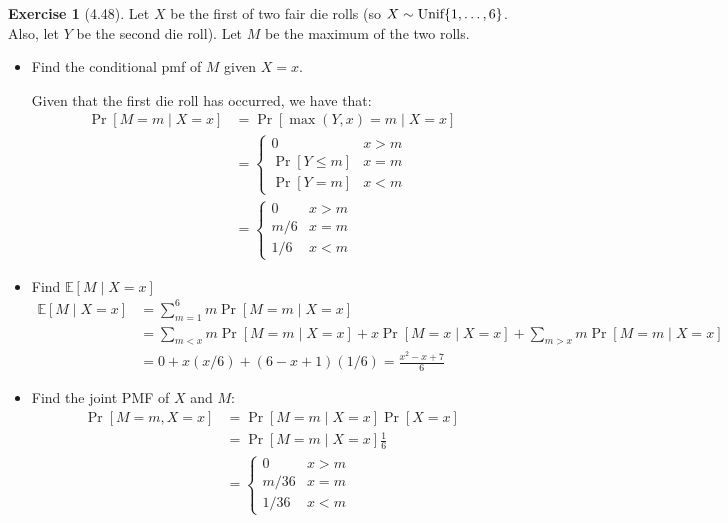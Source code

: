 \documentclass{article}
\theoremstyle{definition}
\newtheorem{exercise}{Exercise}[section]
\newcommand{\E}{\mathbb{E}}
\begin{document}
\begin{exercise}[4.48]
Let $X$ be the first of two fair die rolls (so $X\sim\text{Unif}\Bqty{1,\dots,6}$. Also, let $Y$ be the second die roll).
Let $M$ be the maximum of the two rolls.
\begin{itemize}
\item Find the conditional pmf of $M$ given $X = x$.

Given that the first die roll has occurred, we have that: 
\begin{align*}
\Pr[M = m\mid X = x] &= \Pr[\max(Y,x) = m\mid X = x] \\
&= \begin{cases}
0 & x > m \\
\Pr[Y \leq m] & x = m \\
\Pr[Y = m] & x < m
\end{cases}\\
&=\begin{cases}
0 & x > m \\
m/6 & x = m \\
1/6 & x < m
\end{cases}
\end{align*}
\item Find $\E[M\mid X = x]$
\begin{align*}
\E[M\mid X = x] &= \sum_{m = 1}^6 m\Pr[M = m\mid X = x] \\
& = \sum_{m < x} m \Pr[M= m\mid X =x ] + x\Pr[M = x\mid X = x] + \sum_{m > x}m \Pr[M = m\mid X = x] \\
& = 0 + x(x/6) + (6-x+1)(1/6) = \frac{x^2-x+7}{6}
\end{align*}
\item Find the joint PMF of $X$ and $M$:
\begin{align*}
\Pr[M = m, X = x] &= \Pr[M = m\mid X = x]\Pr[X = x] \\
& = \Pr[M = m\mid X =x ]\frac{1}{6} \\
& = \begin{cases}
0 & x> m \\
m/36 & x = m \\
1/36 & x < m
\end{cases}
\end{align*}
\end{itemize}
\end{exercise}
\end{document}
